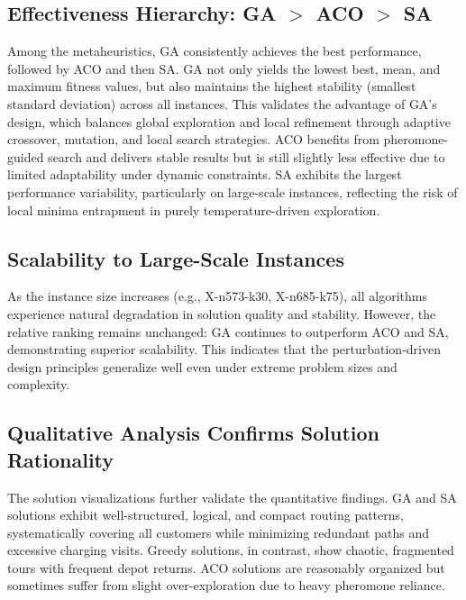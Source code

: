 \subsection{Effectiveness Hierarchy: GA $>$ ACO $>$ SA}
Among the metaheuristics, GA consistently achieves the best performance, followed by ACO and then SA. 
GA not only yields the lowest best, mean, and maximum fitness values, but also maintains the highest stability (smallest standard deviation) across all instances.
This validates the advantage of GA’s design, which balances global exploration and local refinement through adaptive crossover, mutation, and local search strategies.  
ACO benefits from pheromone-guided search and delivers stable results but is still slightly less effective due to limited adaptability under dynamic constraints.
SA exhibits the largest performance variability, particularly on large-scale instances, reflecting the risk of local minima entrapment in purely temperature-driven exploration.

\subsection{Scalability to Large-Scale Instances}
As the instance size increases (e.g., X-n573-k30, X-n685-k75), all algorithms experience natural degradation in solution quality and stability.
However, the relative ranking remains unchanged: GA continues to outperform ACO and SA, demonstrating superior scalability.
This indicates that the perturbation-driven design principles generalize well even under extreme problem sizes and complexity.

\subsection{Qualitative Analysis Confirms Solution Rationality}
The solution visualizations further validate the quantitative findings.  
GA and SA solutions exhibit well-structured, logical, and compact routing patterns, systematically covering all customers while minimizing redundant paths and excessive charging visits. 
Greedy solutions, in contrast, show chaotic, fragmented tours with frequent depot returns.
ACO solutions are reasonably organized but sometimes suffer from slight over-exploration due to heavy pheromone reliance.


